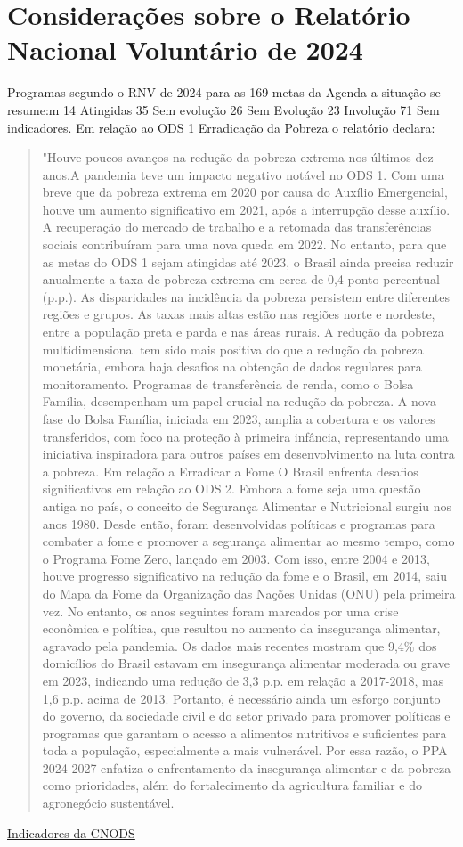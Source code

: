 \section{Considerações sobre o Relatório Nacional Voluntário de 2024}
Programas
segundo o RNV de 2024 para as 169 metas da Agenda a situação se resume:m
14 Atingidas
35 Sem evolução
26 Sem Evolução
23 Involução
71 Sem indicadores.
Em relação ao ODS 1 Erradicação da Pobreza o relatório declara:
\begin{quotation}
  "Houve poucos avanços na redução da pobreza extrema nos últimos dez anos.A pandemia teve um impacto negativo notável no ODS 1. Com uma breve que da pobreza extrema em 2020 por causa do Auxílio Emergencial, houve um aumento significativo em 2021, após a interrupção desse auxílio. A recuperação do mercado de trabalho e a retomada das transferências sociais contribuíram para uma nova queda em 2022. No entanto, para que as metas do ODS 1 sejam atingidas até 2023, o Brasil ainda precisa reduzir anualmente a taxa de pobreza extrema em cerca de 0,4 ponto percentual (p.p.). As disparidades na incidência da pobreza persistem entre diferentes regiões e grupos. As taxas mais altas estão nas regiões norte e nordeste, entre a população preta e parda e nas áreas rurais. A redução da pobreza multidimensional tem sido mais positiva do que a redução da pobreza monetária, embora haja desafios na obtenção de dados regulares para monitoramento. Programas de transferência de renda, como o Bolsa Família, desempenham um papel crucial na redução da pobreza. A nova fase do Bolsa Família, iniciada em 2023, amplia a cobertura e os valores transferidos, com foco na proteção à primeira infância, representando uma iniciativa inspiradora para outros países em desenvolvimento na luta contra a pobreza.  Em relação a Erradicar a Fome O Brasil enfrenta desafios significativos em relação ao ODS 2. Embora a fome seja uma questão antiga no país, o conceito de Segurança Alimentar e Nutricional surgiu nos anos 1980. Desde então, foram desenvolvidas políticas e programas para combater a fome e promover a segurança alimentar ao mesmo tempo, como o Programa Fome Zero, lançado em 2003. Com isso, entre 2004 e 2013, houve progresso significativo na redução da fome e o Brasil, em 2014, saiu do Mapa da Fome da Organização das Nações Unidas (ONU) pela primeira vez. No entanto, os anos seguintes foram marcados por uma crise econômica e política, que resultou no aumento da insegurança alimentar, agravado pela pandemia. Os dados mais recentes mostram que 9,4\% dos domicílios do Brasil estavam em insegurança alimentar moderada ou grave em 2023, indicando uma redução de 3,3 p.p. em relação a 2017-2018, mas 1,6 p.p. acima de 2013. Portanto, é necessário ainda um esforço conjunto do governo, da sociedade civil e do setor privado para promover políticas e programas que garantam o acesso a alimentos nutritivos e suficientes para toda a população, especialmente a mais vulnerável. Por essa razão, o PPA 2024-2027 enfatiza o enfrentamento da insegurança alimentar e da pobreza como prioridades, além do fortalecimento da agricultura familiar e do agronegócio sustentável.
\end{quotation}
\href{https://odsbrasil.gov.br/objetivo1/indicador111}{Indicadores da CNODS} 
